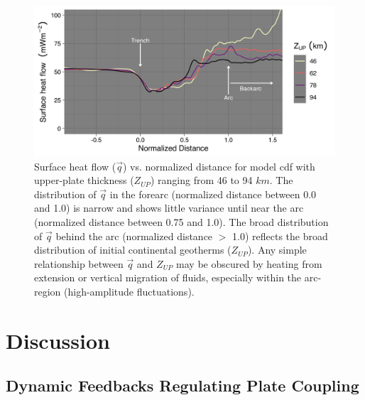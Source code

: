 \begin{figure}[htbp]

{\centering \includegraphics[width=1\linewidth,]{assets/figs/chpt2/fig5} 

}

\caption[Surface heat flow calculated from numerical experiments]{Surface heat flow ($\vec{q}$) vs. normalized distance for model cdf with upper-plate thickness ($Z_{UP}$) ranging from 46 to 94 $km$. The distribution of $\vec{q}$ in the forearc (normalized distance between 0.0 and 1.0) is narrow and shows little variance until near the arc (normalized distance between 0.75 and 1.0). The broad distribution of $\vec{q}$ behind the arc (normalized distance $>$ 1.0) reflects the broad distribution of initial continental geotherms ($Z_{UP}$). Any simple relationship between $\vec{q}$ and $Z_{UP}$ may be obscured by heating from extension or vertical migration of fluids, especially within the arc-region (high-amplitude fluctuations).}\label{fig:hf78}
\end{figure}

\hypertarget{chpt2Discussion}{%
\section{Discussion}\label{chpt2Discussion}}

\hypertarget{dynamic-feedbacks-regulating-plate-coupling}{%
\subsection{Dynamic Feedbacks Regulating Plate Coupling}\label{dynamic-feedbacks-regulating-plate-coupling}}

